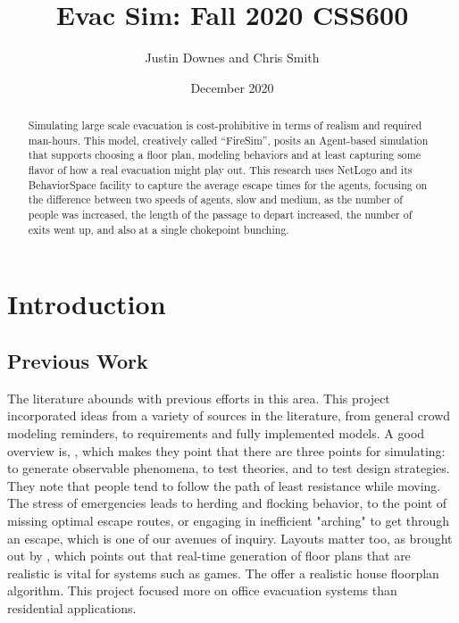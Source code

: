 \documentclass[12pt,letterpaper]{article}
\begin{document}
\title{Evac Sim: Fall 2020 CSS600 }

\author{Justin Downes and Chris Smith}
\date{December 2020}
\maketitle

\begin{abstract}
Simulating large scale evacuation is cost-prohibitive in terms of realism and
required man-hours. This model, creatively called ``FireSim'', posits an
Agent-based simulation that supports choosing a floor plan,
modeling behaviors and at least capturing some flavor of how a real evacuation
might play out. This research uses NetLogo and its BehaviorSpace facility to capture the
average escape times for the agents, focusing on the difference between two
speeds of agents, slow and medium, as  the number of people was increased, the
length of the passage to depart increased, the number of exits went up, and also
at a single chokepoint bunching.
\end{abstract}
\section {Introduction}


%
 
\subsection{Previous Work}
The literature abounds with previous efforts in this area. This project incorporated ideas from a variety of sources in the literature, from general crowd modeling reminders, to requirements and fully implemented models. A good overview is, \cite{almeidaCrowdSimulationModeling2013}, which makes they point that there are three points for simulating: to generate observable phenomena, to test theories, and to test design strategies. They note that people tend to follow the path of least resistance while moving. The stress of emergencies leads to herding and flocking behavior, to the point of missing optimal escape routes, or engaging in inefficient "arching" to get through an escape, which is one of our avenues of inquiry. Layouts matter too, as brought out by \cite{mirahmadiNovelAlgorithmRealtime2012}, which points out that real-time generation of floor plans that are realistic is vital for systems such as  games. The offer a realistic house floorplan algorithm. This project focused more on office evacuation systems than residential applications.
\end{document}

